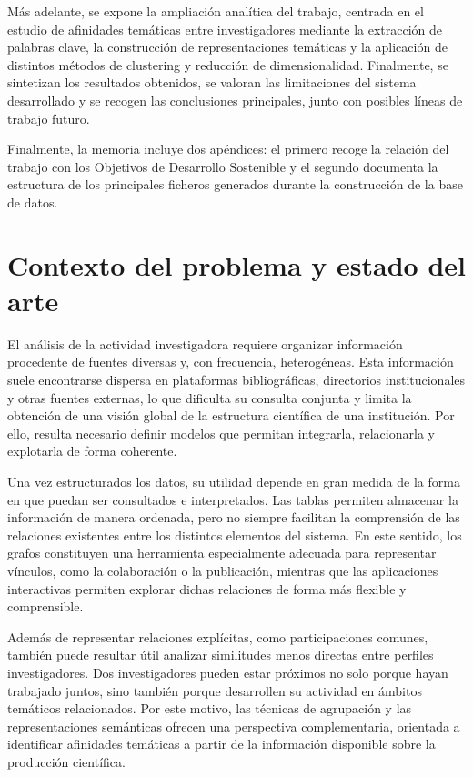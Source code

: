 \documentclass[11pt,spanish,listoffigures,listoftables]{tfgetsinf}
\begin{document}
Más adelante, se expone la ampliación analítica del trabajo, centrada en el estudio de afinidades temáticas entre investigadores mediante la extracción de palabras clave, la construcción de representaciones temáticas y la aplicación de distintos métodos de clustering y reducción de dimensionalidad. Finalmente, se sintetizan los resultados obtenidos, se valoran las limitaciones del sistema desarrollado y se recogen las conclusiones principales, junto con posibles líneas de trabajo futuro.

Finalmente, la memoria incluye dos apéndices: el primero recoge la relación del trabajo con los Objetivos de Desarrollo Sostenible y el segundo documenta la estructura de los principales ficheros generados durante la construcción de la base de datos.


\chapter{Contexto del problema y estado del arte}

El análisis de la actividad investigadora requiere organizar información procedente de fuentes diversas y, con frecuencia, heterogéneas. Esta información suele encontrarse dispersa en plataformas bibliográficas, directorios institucionales y otras fuentes externas, lo que dificulta su consulta conjunta y limita la obtención de una visión global de la estructura científica de una institución. Por ello, resulta necesario definir modelos que permitan integrarla, relacionarla y explotarla de forma coherente.

Una vez estructurados los datos, su utilidad depende en gran medida de la forma en que puedan ser consultados e interpretados. Las tablas permiten almacenar la información de manera ordenada, pero no siempre facilitan la comprensión de las relaciones existentes entre los distintos elementos del sistema. En este sentido, los grafos constituyen una herramienta especialmente adecuada para representar vínculos, como la colaboración o la publicación, mientras que las aplicaciones interactivas permiten explorar dichas relaciones de forma más flexible y comprensible.

Además de representar relaciones explícitas, como participaciones comunes, también puede resultar útil analizar similitudes menos directas entre perfiles investigadores. Dos investigadores pueden estar próximos no solo porque hayan trabajado juntos, sino también porque desarrollen su actividad en ámbitos temáticos relacionados. Por este motivo, las técnicas de agrupación y las representaciones semánticas ofrecen una perspectiva complementaria, orientada a identificar afinidades temáticas a partir de la información disponible sobre la producción científica.
\end{document}
